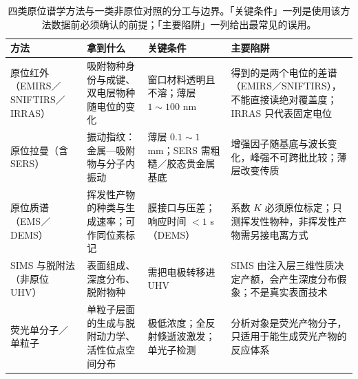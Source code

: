 \begin{table}[htbp]
 \centering
 \caption{四类原位谱学方法与一类非原位对照的分工与边界。「关键条件」一列是使用该方法数据前必须确认的前提；「主要陷阱」一列给出最常见的误用。}
 \label{tab:ch11c-insitu-methods}
 \begin{tabularx}{\onecolwidth}{@{}p{20mm}p{29mm}p{30mm}X@{}}
  \toprule
  方法 & 拿到什么 & 关键条件 & 主要陷阱 \\
  \midrule
  原位红外（EMIRS／SNIFTIRS／IRRAS） & 吸附物种身份与成键、双电层物种随电位的变化 & 窗口材料透明且不溶；薄层 $1\sim100$ nm & 得到的是两个电位的差谱（EMIRS／SNIFTIRS），不能直接读绝对覆盖度；IRRAS 只代表固定电位 \\
  原位拉曼（含 SERS） & 振动指纹：金属—吸附物与分子内振动 & 薄层 $0.1\sim1$ mm；SERS 需粗糙／胶态贵金属基底 & 增强因子随基底与波长变化，峰强不可跨批比较；薄层改变传质 \\
  原位质谱（EMS／DEMS） & 挥发性产物的种类与生成速率；可作同位素标记 & 膜接口与压差；响应时间 $<1$ s（DEMS） & 系数 $K$ 必须原位标定；只测挥发性物种，非挥发性产物需另接电离方式 \\
  SIMS 与脱附法（非原位 UHV） & 表面组成、深度分布、脱附物种 & 需把电极转移进 UHV & SIMS 由注入层三维性质决定产额，会产生深度分布假象；不是真实表面技术 \\
  荧光单分子／单粒子 & 单粒子层面的生成与脱附动力学、活性位点空间分布 & 极低浓度；全反射倏逝波激发；单光子检测 & 分析对象是荧光产物分子，只适用于能生成荧光产物的反应体系 \\
  \bottomrule
 \end{tabularx}
\end{table}

